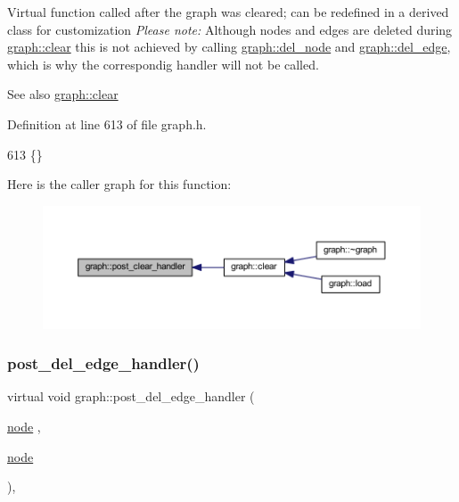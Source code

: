 Virtual function called after the graph was cleared; can be redefined in a derived class for customization {\itshape Please note\+:} Although nodes and edges are deleted during \mbox{\hyperlink{classgraph_a9ff5d6af3653e79f87b836701453f55a}{graph\+::clear}} this is not achieved by calling \mbox{\hyperlink{classgraph_a8bdc09d5b9ac4bd26586b054d8fcbe91}{graph\+::del\+\_\+node}} and \mbox{\hyperlink{classgraph_ad9356508c49c542dfd4b7169297387c6}{graph\+::del\+\_\+edge}}, which is why the correspondig handler will not be called.

\begin{DoxySeeAlso}{See also}
\mbox{\hyperlink{classgraph_a9ff5d6af3653e79f87b836701453f55a}{graph\+::clear}} 
\end{DoxySeeAlso}


Definition at line 613 of file graph.\+h.


\begin{DoxyCode}
613 \{\} 
\end{DoxyCode}
Here is the caller graph for this function\+:
\nopagebreak
\begin{figure}[H]
\begin{center}
\leavevmode
\includegraphics[width=350pt]{classgraph_a870633528590b7925cd27776bdd2bbd2_icgraph}
\end{center}
\end{figure}
\mbox{\label{classgraph_ab9ac8bcc7288986de69cd467beb33600}} 
\subsubsection{\texorpdfstring{post\+\_\+del\+\_\+edge\+\_\+handler()}{post\_del\_edge\_handler()}}
{\footnotesize\ttfamily virtual void graph\+::post\+\_\+del\+\_\+edge\+\_\+handler (\begin{DoxyParamCaption}\item[{\mbox{\hyperlink{classnode}{node}}}]{,  }\item[{\mbox{\hyperlink{classnode}{node}}}]{ }\end{DoxyParamCaption})\hspace{0.3cm}{\ttfamily [inline]}, {\ttfamily [virtual]}}

